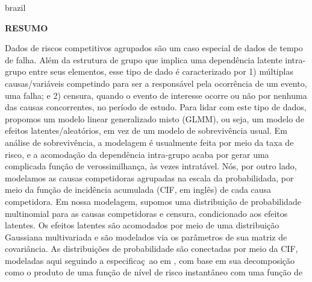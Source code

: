 \documentclass[12pt, %
               openright, %
               oneside, %
               a4paper, %
               chapter=TITLE, %
               section=TITLE, %
               brazil,
               english %
]{abntex2}
\begin{document}
\newpage
\setlength{\absparsep}{18pt} %
\setlength{\abstitleskip}{1cm} %
\begin{resumo}[]
  \begin{otherlanguage*}{brazil}
    \vspace{-2cm}
    \begin{center}
      \bfseries{\large{\textsf{RESUMO}}}
    \end{center}
    \vspace{0.3cm}

    Dados de riscos competitivos agrupados s\~{a}o um caso especial de
    dados de tempo de falha. Al\'{e}m da estrutura de grupo que implica
    uma depend\^{e}ncia latente intra-grupo entre seus elementos, esse
    tipo de dado \'{e} caracterizado por 1) m\'{u}ltiplas
    causas/vari\'{a}veis ​​competindo para ser a respons\'{a}vel pela
    ocorr\^{e}ncia de um evento, uma falha; e 2) censura, quando o
    evento de interesse ocorre ou n\~{a}o por nenhuma das causas
    concorrentes, no per\'{i}odo de estudo. Para lidar com este tipo de
    dados, propomos um modelo linear generalizado misto (GLMM), ou seja,
    um modelo de efeitos latentes/aleat\'{o}rios, em vez de um modelo de
    sobreviv\^{e}ncia usual. Em an\'{a}lise de sobreviv\^{e}ncia, a
    modelagem \'{e} usualmente feita por meio da taxa de risco, e a
    acomodação da depend\^{e}ncia intra-grupo acaba por gerar uma
    complicada fun\c{c}\~{a}o de verossimilhan\c{c}a, \`{a}s vezes
    intrat\'{a}vel. N\'{o}s, por outro lado, modelamos as causas
    competidoras agrupadas na escala da probabilidada, por meio da
    fun\c{c}\~{a}o de incid\^{e}ncia acumulada (CIF, em ingl\^{e}s) de
    cada causa competidora. Em nossa modelagem, supomos uma
    distribui\c{c}\~{a}o de probabilidade multinomial para as causas
    competidoras e censura, condicionado aos efeitos latentes. Os
    efeitos latentes são acomodados por meio de uma distribui\c{c}\~{a}o
    Gaussiana multivariada e s\~{a}o modelados via os par\^{a}metros de
    sua matriz de covari\^{a}ncia. As distribui\c{c}\~{o}es de
    probabilidade s\~{a}o conectadas por meio da CIF, modeladas aqui
    seguindo a especifica\c{c}~{a}o em , com base em
    sua decomposi\c{c}\~{a}o como o produto de uma fun\c{c}\~{a}o de
    n\'{i}vel de risco instant\^{a}neo com uma fun\c{c}\~{a}o de

\end{otherlanguage*}
\end{resumo}
\end{document}
